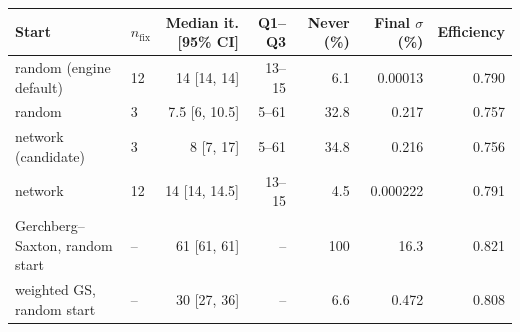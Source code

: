 \begin{tabular}{@{}llrrrrr@{}}
\toprule
Start & $n_{\mathrm{fix}}$ & Median it. [95\% CI] & Q1--Q3 & Never (\%) & Final $\sigma$ (\%) & Efficiency \\
\midrule
random (engine default) & 12 & 14 [14, 14] & 13--15 & 6.1 & 0.00013 & 0.790 \\
random & 3 & 7.5 [6, 10.5] & 5--61 & 32.8 & 0.217 & 0.757 \\
network (candidate) & 3 & 8 [7, 17] & 5--61 & 34.8 & 0.216 & 0.756 \\
network & 12 & 14 [14, 14.5] & 13--15 & 4.5 & 0.000222 & 0.791 \\
Gerchberg--Saxton, random start & -- & 61 [61, 61] & -- & 100 & 16.3 & 0.821 \\
weighted GS, random start & -- & 30 [27, 36] & -- & 6.6 & 0.472 & 0.808 \\
\bottomrule
\end{tabular}
